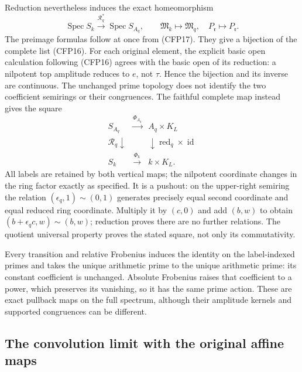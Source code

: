 Reduction nevertheless induces the exact homeomorphism
\begin{equation}\tag{CFP19}
 \operatorname{Spec}S_k\xrightarrow{\mathcal R_q^*}
          \operatorname{Spec}S_{A_q},\qquad
 \mathfrak M_k\longmapsto\mathfrak M_q,\quad
 P_{\mathfrak r}\longmapsto P_{\mathfrak r}.
\end{equation}
The preimage formulas follow at once from (CFP17).
They give a bijection of the complete list (CFP16).
For each original element, the explicit basic open
calculation following (CFP16) agrees with the
basic open of its reduction: a nilpotent top
amplitude reduces to $e$, not $\tau$. Hence the
bijection and its inverse are continuous.
The unchanged prime topology does not identify
the two coefficient semirings or their congruences.
The faithful complete map instead gives the square
\begin{equation}\tag{CFP20}
\begin{array}{ccc}
 S_{A_q}&\xrightarrow{\Phi_{A_q}}&A_q\times K_L\\
 {\scriptstyle\mathcal R_q}\downarrow&&
      \downarrow{\scriptstyle\operatorname{red}_q\times\operatorname{id}}\\
 S_k&\xrightarrow{\Phi_k}&k\times K_L.
\end{array}
\end{equation}
All labels are retained by both vertical maps;
the nilpotent coordinate changes in the ring
factor exactly as specified. It is a pushout:
on the upper-right semiring the relation
$(\epsilon_q,1)\sim(0,1)$ generates precisely
equal second coordinate and equal reduced ring
coordinate. Multiply it by $(c,0)$ and add
$(b,w)$ to obtain $(b+\epsilon_qc,w)\sim(b,w)$;
reduction proves there are no further relations.
The quotient universal property proves the
stated square, not only its commutativity.

Every transition and relative Frobenius induces
the identity on the label-indexed primes and
takes the unique arithmetic prime to the
unique arithmetic prime: its constant coefficient
is unchanged. Absolute Frobenius raises that
coefficient to a power, which preserves its
vanishing, so it has the same prime action.
These are exact pullback maps on the full
spectrum, although their amplitude kernels
and supported congruences can be different.

\subsection{The convolution limit with the original affine maps}

